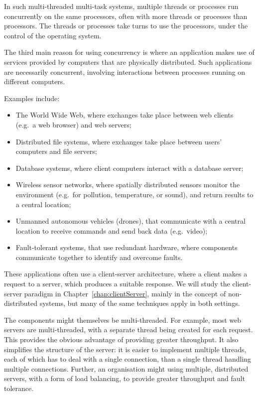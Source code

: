In such multi-threaded multi-task systems, multiple threads or processes run
concurrently on the same processors, often with more threads or processes than
processors.  The threads or processes take turns to use the processors, under
the control of the operating system.


The third main reason for using concurrency is where an application makes use
of services provided by computers that are physically distributed.  Such
applications are necessarily concurrent, involving interactions between
processes running on different computers.

Examples include:
\begin{itemize}
\item The World Wide Web, where exchanges take place between web
clients (e.g.~a web browser) and web servers; 

\item Distributed file systems, where exchanges take place between users'
  computers and file servers;

\item Database systems, where client computers interact with a database
  server;

\item Wireless sensor networks, where spatially distributed sensors monitor
  the environment (e.g.~for pollution, temperature, or sound), and return
  results to a central location;

\item Unmanned autonomous vehicles (drones), that communicate with a central
  location to receive commands and send back data (e.g.~video);

\item Fault-tolerant systems, that use redundant hardware, where components
  communicate together to identify and overcome faults. 
\end{itemize}

These applications often use a client-server architecture, where a client
makes a request to a server, which produces a suitable response.  We will
study the client-server paradigm in Chapter~\ref{chap:clientServer}, mainly in
the concept of non-distributed systems, but many of the same techniques apply
in both settings.

The components might themselves be multi-threaded.  For example, most web
servers are multi-threaded, with a separate thread being created for each
request.  This provides the obvious advantage of providing greater throughput.
It also simplifies the structure of the server: it is easier to implement
multiple threads, each of which has to deal with a single connection, than a
single thread handling multiple connections.  Further, an organisation might
using multiple, distributed servers, with a form of load balancing, to provide
greater throughput and fault tolerance.

